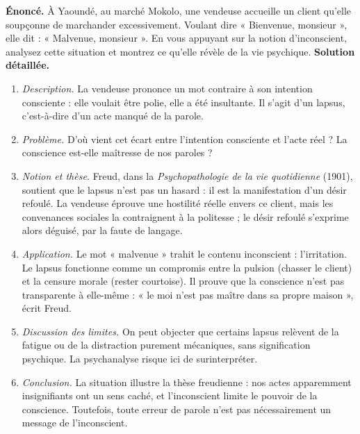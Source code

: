 \documentclass[11pt]{article}
\newcommand{\cle}[1]{{\popxbold\color{popdark}#1}}
\begin{document}
\begin{exoresolu}
\textbf{Énoncé.} À Yaoundé, au marché Mokolo, une vendeuse accueille un client qu'elle soupçonne de marchander excessivement. Voulant dire « Bienvenue, monsieur », elle dit : « Malvenue, monsieur ». En vous appuyant sur la notion d'inconscient, analysez cette situation et montrez ce qu'elle révèle de la vie psychique.
\tcblower
\textbf{Solution détaillée.}
\begin{enumerate}
\item \emph{Description.} La vendeuse prononce un mot contraire à son intention consciente : elle voulait être polie, elle a été insultante. Il s'agit d'un \cle{lapsus}, c'est-à-dire d'un acte manqué de la parole.
\item \emph{Problème.} D'où vient cet écart entre l'intention consciente et l'acte réel ? La conscience est-elle maîtresse de nos paroles ?
\item \emph{Notion et thèse.} Freud, dans la \emph{Psychopathologie de la vie quotidienne} (1901), soutient que le lapsus n'est pas un hasard : il est la manifestation d'un désir refoulé. La vendeuse éprouve une hostilité réelle envers ce client, mais les convenances sociales la contraignent à la politesse ; le désir refoulé s'exprime alors déguisé, par la faute de langage.
\item \emph{Application.} Le mot « malvenue » trahit le contenu inconscient : l'irritation. Le lapsus fonctionne comme un compromis entre la pulsion (chasser le client) et la censure morale (rester courtoise). Il prouve que la conscience n'est pas transparente à elle-même : « le moi n'est pas maître dans sa propre maison », écrit Freud.
\item \emph{Discussion des limites.} On peut objecter que certains lapsus relèvent de la fatigue ou de la distraction purement mécaniques, sans signification psychique. La psychanalyse risque ici de surinterpréter.
\item \emph{Conclusion.} La situation illustre la thèse freudienne : nos actes apparemment insignifiants ont un sens caché, et l'inconscient limite le pouvoir de la conscience. Toutefois, toute erreur de parole n'est pas nécessairement un message de l'inconscient.
\end{enumerate}
\end{exoresolu}
\end{document}
